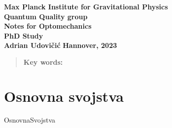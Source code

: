 \documentclass[12pt]{article}
\begin{document}
\begin{titlepage}
	\begin{center}
		{\large \textbf{Max Planck Institute for Gravitational Physics}} \\[0.1cm]
		{\large \textbf{Quantum Quality group}}\\[0.1cm]
		{\large \textbf{Notes for Optomechanics}} \\[0.1cm]
		{\LARGE\textbf{PhD Study}}\\[2.5cm]
		\vspace{2cm}
		{\LARGE \textbf{Adrian Udovičić}}
		\vfill
		\large\textbf{{Hannover, 2023} }
	\end{center}
\end{titlepage}


\newpage
{}
\begin{abstract}
	\textbf{Key words:}
\end{abstract}
\newpage
\tableofcontents
\newpage

\section{Osnovna svojstva}
{OsnovnaSvojstva}
\end{document}

